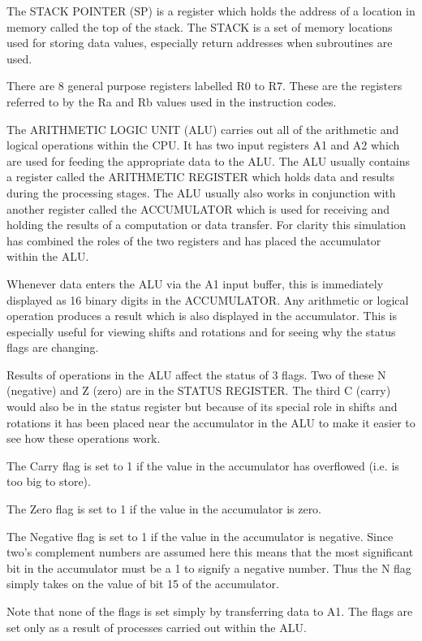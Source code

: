 \documentclass{article}
\begin{document}
The STACK POINTER (SP) is a register which holds the address of a location in memory called the top of the stack. The STACK is a set of memory locations used for storing data values, especially return addresses when subroutines are used.

There are 8 general purpose registers labelled R0 to R7. These are the registers referred to by the Ra and Rb values used in the instruction codes.

The ARITHMETIC LOGIC UNIT (ALU) carries out all of the arithmetic and logical operations within the CPU. It has two input registers A1 and A2 which are used for feeding the appropriate data to the ALU. The ALU usually contains a register called the ARITHMETIC REGISTER which holds data and results during the processing stages. The ALU usually also works in conjunction with another register called the ACCUMULATOR which is used for receiving and holding the results of a computation or data transfer. For clarity this simulation has combined the roles of the two registers and has placed the accumulator within the ALU.

Whenever data enters the ALU via the A1 input buffer, this is immediately displayed as 16 binary digits in the ACCUMULATOR. Any arithmetic or logical operation produces a result which is also displayed in the accumulator. This is especially useful for viewing shifts and rotations and for seeing why the status flags are changing.

Results of operations in the ALU affect the status of 3 flags. Two of these N (negative) and Z (zero) are in the STATUS REGISTER. The third C (carry) would also be in the status register but because of its special role in shifts and rotations it has been placed near the accumulator in the ALU to make it easier to see how these operations work.

The Carry flag is set to 1 if the value in the accumulator has overflowed (i.e. is too big to store).

The Zero flag is set to 1 if the value in the accumulator is zero.

The Negative flag is set to 1 if the value in the accumulator is negative. Since two's complement numbers are assumed here this means that the most significant bit in the accumulator must be a 1 to signify a negative number. Thus the N flag simply takes on the value of bit 15 of the accumulator.

Note that none of the flags is set simply by transferring data to A1. The flags are set only as a result of processes carried out within the ALU.
\end{document}

